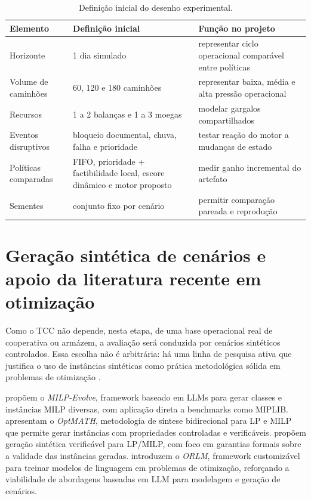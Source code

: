 \documentclass[
  12pt,
  oneside,
  a4paper,
  sumario=tradicional,
  brazil
]{abntex2}
\begin{document}
\begin{table}[H]
\centering
\small
\renewcommand{\arraystretch}{1.18}
\begin{tabularx}{\textwidth}{@{}P{0.22\textwidth}P{0.27\textwidth}Y@{}}
\toprule
\textbf{Elemento} & \textbf{Defini\c{c}\~ao inicial} & \textbf{Fun\c{c}\~ao no projeto} \\
\midrule
Horizonte & 1 dia simulado & representar ciclo operacional compar\'avel entre pol\'iticas \\
\addlinespace
Volume de caminh\~oes & 60, 120 e 180 caminh\~oes & representar baixa, m\'edia e alta press\~ao operacional \\
\addlinespace
Recursos & 1 a 2 balan\c{c}as e 1 a 3 moegas & modelar gargalos compartilhados \\
\addlinespace
Eventos disruptivos & bloqueio documental, chuva, falha e prioridade & testar rea\c{c}\~ao do motor a mudan\c{c}as de estado \\
\addlinespace
Pol\'iticas comparadas & FIFO, prioridade + factibilidade local, escore din\^amico e motor proposto & medir ganho incremental do artefato \\
\addlinespace
Sementes & conjunto fixo por cen\'ario & permitir compara\c{c}\~ao pareada e reprodu\c{c}\~ao \\
\bottomrule
\end{tabularx}
\caption{Defini\c{c}\~ao inicial do desenho experimental.}
\end{table}

\section{Gera\c{c}\~ao sint\'etica de cen\'arios e apoio da literatura recente em otimiza\c{c}\~ao}

Como o TCC n\~ao depende, nesta etapa, de uma base operacional real de cooperativa ou arm\'azem, a avalia\c{c}\~ao ser\'a conduzida por cen\'arios sint\'eticos controlados. Essa escolha n\~ao \'e arbitr\'aria: h\'a uma linha de pesquisa ativa que justifica o uso de inst\^ancias sint\'eticas como pr\'atica metodol\'ogica s\'olida em problemas de otimiza\c{c}\~ao \cite{Li2025,Lu2025,Lima2025,Huang2025}.

 prop\~oem o \textit{MILP-Evolve}, framework baseado em LLMs para gerar classes e inst\^ancias MILP diversas, com aplica\c{c}\~ao direta a benchmarks como MIPLIB.  apresentam o \textit{OptMATH}, metodologia de s\'intese bidirecional para LP e MILP que permite gerar inst\^ancias com propriedades controladas e verific\'aveis.  prop\~oem gera\c{c}\~ao sint\'etica verific\'avel para LP/MILP, com foco em garantias formais sobre a validade das inst\^ancias geradas.  introduzem o \textit{ORLM}, framework customiz\'avel para treinar modelos de linguagem em problemas de otimiza\c{c}\~ao, refor\c{c}ando a viabilidade de abordagens baseadas em LLM para modelagem e gera\c{c}\~ao de cen\'arios.
\end{document}
